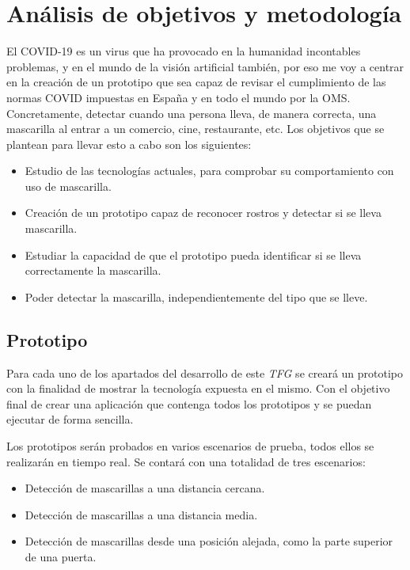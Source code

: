 
\lstset{frame=single,basicstyle=\ttfamily\small}

\chapter{Análisis de objetivos y metodología}

El COVID-19 es un virus que ha provocado en la humanidad incontables problemas, y en el mundo de la visión artificial también, por eso me voy a centrar en la creación de un prototipo que sea capaz de revisar el cumplimiento de las normas COVID impuestas en España y en todo el mundo por la OMS. Concretamente, detectar cuando una persona lleva, de manera correcta, una mascarilla al entrar a un comercio, cine, restaurante, etc. Los objetivos que se plantean para llevar esto a cabo son los siguientes:

\begin{itemize}
	\item Estudio de las tecnologías actuales, para comprobar su comportamiento con uso de mascarilla.
	\item Creación de un prototipo capaz de reconocer rostros y detectar si se lleva mascarilla.
	\item Estudiar la capacidad de que el prototipo pueda identificar si se lleva correctamente la mascarilla. 
	\item Poder detectar la mascarilla, independientemente del tipo que se lleve.
\end{itemize}

\section{Prototipo}

Para cada uno de los apartados del desarrollo de este \textit{TFG} se creará un prototipo con la finalidad de mostrar la tecnología expuesta en el mismo. Con el objetivo final de crear una aplicación que contenga todos los prototipos y se puedan ejecutar de forma sencilla. 

Los prototipos serán probados en varios escenarios de prueba, todos ellos se realizarán en tiempo real. Se contará con una totalidad de tres escenarios:

\begin{itemize}
	\item Detección de mascarillas a una distancia cercana.
	\item Detección de mascarillas a una distancia media.
	\item Detección de mascarillas desde una posición alejada, como la parte superior de una puerta.
\end{itemize}

